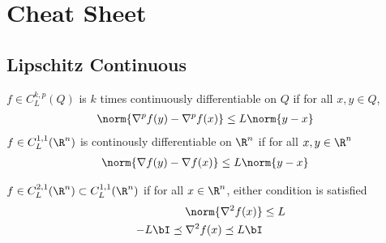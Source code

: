 \documentclass[../summary.tex]{subfiles}
\begin{document}
\section{Cheat Sheet} 

\subsection{Lipschitz Continuous}

\begin{definition}
    $f\in C_{L}^{k,p}(Q)$ is $k$ times continuously differentiable on $Q$ if for all $x,y\in Q$,
    \begin{align}
        \norm{\nabla^p f(y) - \nabla^p f(x)} 
            &\leq L\norm{y-x}
            \label{eq:definition_lipschitz_continuity}
    \end{align} 
    $f\in C_{L}^{1,1}(\R^n)$ is continously differentiable on $\R^n$ if for all $x,y\in\R^n$
    \begin{align}
        \norm{\nabla f(y) - \nabla f(x)} 
            &\leq L\norm{y-x}
            \label{eq:definition_Lsmooth_bounded_gradient}
    \end{align}
\end{definition}

\begin{definition}
    $f\in C_L^{2,1}(\R^n) \subset C_{L}^{1,1}(\R^n)$ if for all $x\in\R^n$, either condition is satisfied
    \begin{align}
        \norm{\nabla^2 f(x)}
            &\leq L 
            \label{eq:definition_Lsmooth_bounded_hessian} \\
        -L\bI \preceq \nabla^2 f(x) \preceq L\bI 
            \label{eq:definition_Lsmooth_bounded_hessian_matrixineq}
    \end{align}
\end{definition}
\end{document}
